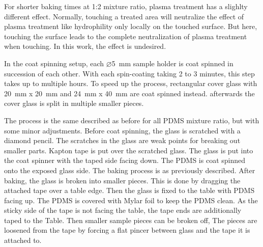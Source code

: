 For shorter baking times at 1:2 mixture ratio, plasma treatment has a slighlty different effect. Normally, touching a treated area will neutralize the effect of plasma treatment like hydrophility only locally on the touched surface. But here, touching the surface leads to the complete neutralization of plasma treatment when touching. In this work, the effect is undesired.



In the coat spinning setup, each  $\varnothing$\SI{5}{\milli\meter} sample holder is coat spinned in succession of each other. With each spin-coating taking 2 to 3 minutes, this step takes up to multiple hours. To speed up the process, rectangular cover glass with \SI{20}{\milli\meter} x \SI{20}{\milli\meter} and \SI{24}{\milli\meter} x \SI{40}{\milli\meter} are coat spinned instead. afterwards the cover glass is split in multiple smaller pieces. 

The process is the same described as before for all PDMS mixture ratio, but with some minor adjustments. Before coat spinning, the glass is scratched with a diamond pencil. The scratches in the glass are weak points for breaking out smaller parts. Kapton tape is put over the scratched glass. The glass is put into the coat spinner with the taped side facing down. The PDMS is coat spinned onto the exposed glass side. The baking process is as previously described. After baking, the glass is broken into smaller pieces. This is done by dragging the attached tape over a table edge. Then the glass is fixed to the table with PDMS facing up. The PDMS is covered with Mylar foil to keep the PDMS clean. As the sticky side of the tape is not facing the table, the tape ends are additionally taped to the Table. Then smaller sample pieces can be broken off, The pieces are loosened from the tape by forcing a flat pincer between glass and the tape it is attached to.


